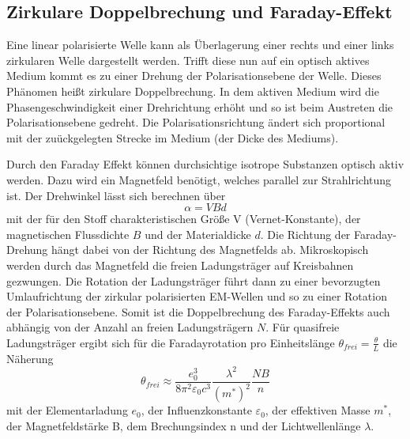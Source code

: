 \subsection{Zirkulare Doppelbrechung und Faraday-Effekt}
Eine linear polarisierte Welle kann als Überlagerung einer rechts und einer links zirkularen Welle dargestellt werden. Trifft diese nun auf ein
optisch aktives Medium kommt es zu einer Drehung der Polarisationsebene der Welle. Dieses Phänomen heißt zirkulare Doppelbrechung. 
In dem aktiven Medium wird die Phasengeschwindigkeit einer Drehrichtung erhöht und so ist beim Austreten die Polarisationsebene gedreht.
Die Polarisationsrichtung ändert sich proportional mit der zuückgelegten Strecke im Medium (der Dicke des Mediums).

Durch den Faraday Effekt können durchsichtige isotrope Substanzen optisch aktiv werden. Dazu wird ein Magnetfeld benötigt, welches parallel zur
Strahlrichtung ist. Der Drehwinkel lässt sich berechnen über
\begin{equation}
    \alpha = VBd
\end{equation}
mit der für den Stoff charakteristischen Größe V (Vernet-Konstante), der magnetischen Flussdichte $B$ und der Materialdicke $d$.
Die Richtung der Faraday-Drehung hängt dabei von der Richtung des Magnetfelds ab.
Mikroskopisch werden durch das Magnetfeld die freien Ladungsträger auf Kreisbahnen gezwungen. Die Rotation der Ladungsträger
führt dann zu einer bevorzugten Umlaufrichtung der zirkular polarisierten EM-Wellen und so zu einer Rotation der Polarisationsebene.
Somit ist die Doppelbrechung des Faraday-Effekts 
auch abhängig von der Anzahl an freien Ladungsträgern $N$.
Für quasifreie Ladungsträger ergibt sich für die Faradayrotation pro Einheitslänge $\theta_{frei} = \frac{\theta}{L}$ die Näherung
\begin{equation}
    \theta_{frei} \approx \frac{e_0^3}{8 \pi^2 \varepsilon_0 c^3} \frac{\lambda^2}{(m^*)^2}\frac{N B}{n}
    \label{eqn:theta}
\end{equation}
mit der Elementarladung $e_0$, der Influenzkonstante $\varepsilon_0$, der effektiven Masse $m^*$, der Magnetfeldstärke B, dem Brechungsindex n und der Lichtwellenlänge $\lambda$.





